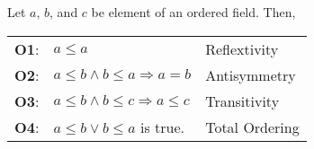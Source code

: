 \documentclass[../main.tex]{subfiles}
\begin{document}
\begin{prop}
    Let $a$, $b$, and $c$ be element of an ordered field. Then,
    \begin{table}[H]
        \centering
        \begin{tabular}{lll}
            \textbf{O1}: & $a \leq a$                                     & Reflextivity   \\
            \textbf{O2}: & $a \leq b \wedge b \leq a \Rightarrow a = b$    & Antisymmetry   \\
            \textbf{O3}: & $a \leq b \wedge b \leq c \Rightarrow a \leq c$ & Transitivity   \\
            \textbf{O4}: & $a \leq b \vee b \leq a$ is true.              & Total Ordering
        \end{tabular}
    \end{table}
\end{prop}
\end{document}

